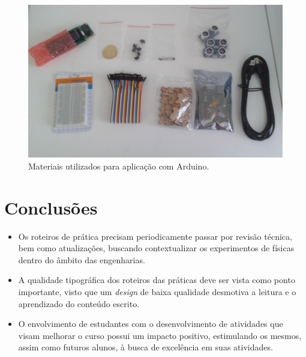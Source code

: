 \documentclass[portrait,a0]{a0poster}
\begin{document}
\begin{multicols}{2}
\begin{figure}[H]
\centering
\includegraphics[width=0.8\linewidth]{materiais.jpg}
\caption{Materiais utilizados para aplicação com Arduino.}
\label{fig:materiais-arduino}
\end{figure}


\color{SaddleBrown} %

\section*{Conclusões}

\begin{itemize}
\item Os roteiros de prática precisam periodicamente passar por revisão técnica, bem como atualizações, buscando contextualizar os experimentos de físicas dentro do âmbito das engenharias.
\item A qualidade tipográfica dos roteiros das práticas deve ser vista como ponto importante, visto que um \emph{design} de baixa qualidade desmotiva a leitura e o aprendizado do conteúdo escrito.
\item O envolvimento de estudantes com o desenvolvimento de atividades que visam melhorar o curso possui um impacto positivo, estimulando os mesmos, assim como futuros alunos, à busca de excelência em suas atividades.
\end{itemize}



\end{multicols}
\end{document}
